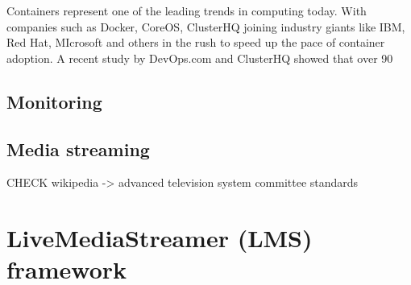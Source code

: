 Containers represent one of the leading trends in computing today. With companies such as Docker, CoreOS, ClusterHQ joining industry giants like IBM, Red Hat, MIcrosoft and others in the rush to speed up the pace of container adoption. A recent study by DevOps.com and ClusterHQ showed that over 90%


\subsection{Monitoring}


\subsection{Media streaming}

CHECK wikipedia -> advanced television system committee standards



\section{LiveMediaStreamer (LMS) framework}







